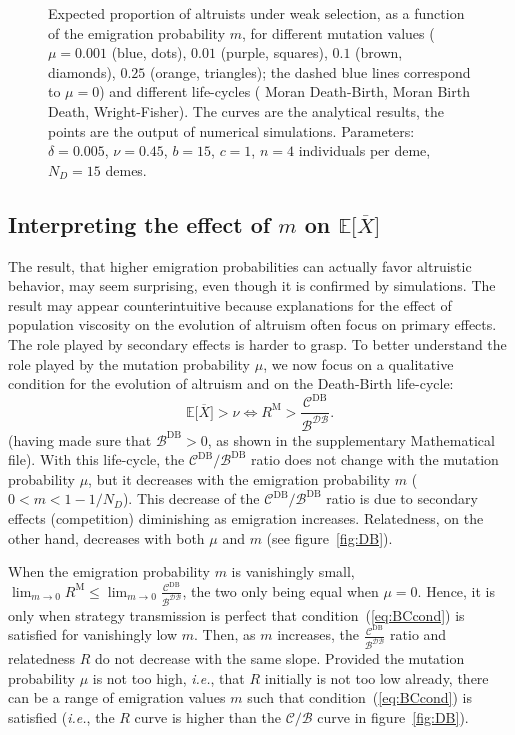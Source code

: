 \documentclass[11pt, letterpaper]{article}
\newcommand{\eqrefnoeq}[1]{(\ref{#1})}
\newcommand{\ie}{\textit{i.e.}}
\newcommand{\Esp}[1]{\mathbb{E}\big[ #1\big]}%
\newcommand{\Moran}{\textrm{M}}
\newcommand{\DB}{\textrm{DB}}
\newcommand{\mutbias}{\nu}
\newcommand{\ndemes}{N_D}
\newcommand{\selstr}{\delta}
\begin{document}
\begin{figure}
\begin{tabular}{ccc}
\end{tabular}
\caption{Expected proportion of altruists under weak selection, as a function of the emigration probability $m$, for different mutation values ($\mu = 0.001$ (blue, dots), $0.01$ (purple, squares), $0.1$ (brown, diamonds), $0.25$ (orange, triangles); the dashed blue lines correspond to $\mu=0$) and different life-cycles ( Moran Death-Birth,  Moran Birth Death,  Wright-Fisher). The curves are the analytical results, the points are the output of numerical simulations. 
Parameters: $\selstr = 0.005$, $\mutbias=0.45$, $b = 15$, $c = 1$, $n=4$ individuals per deme, $\ndemes=15$ demes.}
\label{fig:EX}
\end{figure}

\subsection{Interpreting the effect of $m$ on $\Esp{\overline{X}}$}

The result, that higher emigration probabilities can actually favor altruistic behavior, may seem surprising, even though it is confirmed by simulations. The result may appear counterintuitive because explanations for the effect of population viscosity on the evolution of altruism often focus on primary effects. The role played by secondary effects is harder to grasp. To better understand the role played by the mutation probability $\mu$, we now focus on a qualitative condition for the evolution of altruism and on the Death-Birth life-cycle:
%
\begin{equation}\label{eq:BCcond}
\Esp{\overline{X}} > \nu \Leftrightarrow R^{\Moran} > \frac{\mathcal{C}^{\DB}}{\mathcal{B^{\DB}}}.
\end{equation}
%
(having made sure that $\mathcal{B}^{\DB}>0$, as shown in the supplementary Mathematical file). 
With this life-cycle, the $\mathcal{C}^{\DB}/\mathcal{B}^{\DB}$ ratio does not change with the mutation probability $\mu$, but it decreases with the emigration probability $m$ ($0<m<1-1/\ndemes$). This decrease of the $\mathcal{C}^{\DB}/\mathcal{B}^{\DB}$ ratio is due to secondary effects (competition) diminishing as emigration increases. Relatedness, on the other hand, decreases with both $\mu$ and $m$ (see figure~\ref{fig:DB}). 

When the emigration probability $m$ is vanishingly small, $\lim_{m\to 0} R^{\Moran} \leq \lim_{m\to 0} \frac{\mathcal{C}^{\DB}}{\mathcal{B^{\DB}}}$, the two only being equal when $\mu=0$.
Hence, it is only when strategy transmission is perfect that condition~\eqrefnoeq{eq:BCcond} is satisfied for vanishingly low $m$. Then, as $m$ increases, the $\frac{\mathcal{C}^{\DB}}{\mathcal{B^{\DB}}}$ ratio and relatedness $R$ do not decrease with the same slope. Provided the mutation probability $\mu$ is not too high, \ie, that $R$ initially is not too low already, there can be a range of emigration values $m$ such that condition~\eqrefnoeq{eq:BCcond} is satisfied (\ie, the $R$ curve is higher than the $\mathcal{C}/\mathcal{B}$ curve in figure~\ref{fig:DB}).
\end{document}
